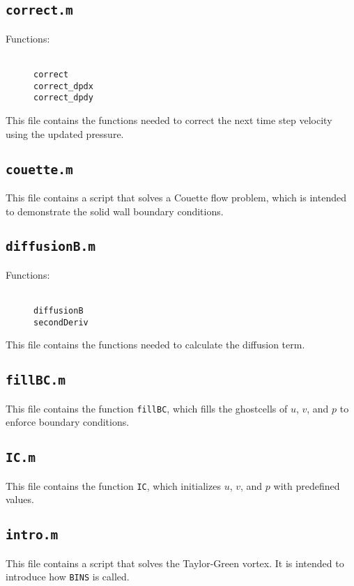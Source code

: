 \documentclass[12pt]{article}
\begin{document}
\subsection{\texttt{correct.m}}
\begin{description}
\item[Functions:] \hfill \\ \texttt{correct} \\ \texttt{correct\_dpdx} \\ \texttt{correct\_dpdy} 
\end{description}
This file contains the functions needed to correct the next time step velocity using the updated pressure.

\subsection{\texttt{couette.m}}
This file contains a script that solves a Couette flow problem, which is intended to demonstrate the solid wall boundary conditions.

\subsection{\texttt{diffusionB.m}}
\begin{description}
\item[Functions:] \hfill \\ \texttt{diffusionB} \\ \texttt{secondDeriv} 
\end{description}
This file contains the functions needed to calculate the diffusion term.

\subsection{\texttt{fillBC.m}}
This file contains the function \texttt{fillBC}, which fills the ghostcells of $u$, $v$, and $p$ to enforce boundary conditions.

\subsection{\texttt{IC.m}}
This file contains the function \texttt{IC}, which initializes $u$, $v$, and $p$ with predefined values.

\subsection{\texttt{intro.m}}
This file contains a script that solves the Taylor-Green vortex.  It is intended to introduce how \texttt{BINS} is called.
\end{document}
